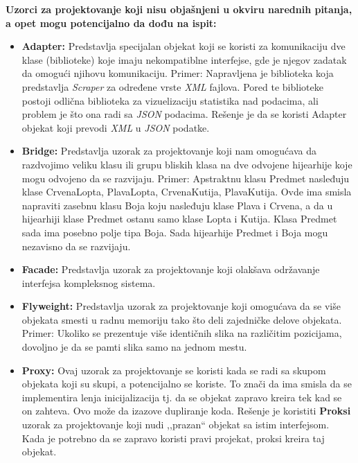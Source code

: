 \documentclass[a4paper]{article}
\begin{document}
  \textbf{Uzorci za projektovanje koji nisu objašnjeni u okviru narednih pitanja, a opet mogu potencijalno da
          dođu na ispit:}
  \begin{itemize}
    \item \textbf{Adapter:} Predstavlja specijalan objekat koji se koristi za komunikaciju dve klase (biblioteke) koje 
          imaju nekompatiblne interfejse, gde je njegov zadatak da omogući njihovu komunikaciju. Primer: Napravljena
          je biblioteka koja predstavlja \textit{Scraper} za određene vrste \textit{XML} fajlova. Pored te biblioteke 
          postoji odlična biblioteka za vizuelizaciju statistika nad podacima, ali problem je što ona radi sa 
          \textit{JSON} podacima. Rešenje je da se koristi Adapter objekat koji prevodi \textit{XML} u \textit{JSON}
          podatke.
    \item \textbf{Bridge:} Predstavlja uzorak za projektovanje koji nam omogućava da razdvojimo veliku klasu
          ili grupu bliskih klasa na dve odvojene hijearhije koje mogu odvojeno da se razvijaju. Primer:
          Apstraktnu klasu Predmet nasleđuju klase CrvenaLopta, PlavaLopta, CrvenaKutija, PlavaKutija. Ovde ima 
          smisla napraviti zasebnu klasu Boja koju nasleđuju klase Plava i Crvena, a da u hijearhiji klase Predmet
          ostanu samo klase Lopta i Kutija. Klasa Predmet sada ima posebno polje tipa Boja. Sada hijearhije 
          Predmet i Boja mogu nezavisno da se razvijaju.
    \item \textbf{Facade:} Predstavlja uzorak za projektovanje koji olakšava održavanje interfejsa kompleksnog sistema.
    \item \textbf{Flyweight:} Predstavlja uzorak za projektovanje koji omogućava da se više objekata smesti u radnu 
          memoriju tako što deli zajedničke delove objekata. Primer: Ukoliko se prezentuje više identičnih slika
          na različitim pozicijama, dovoljno je da se pamti slika samo na jednom mestu.
    \item \textbf{Proxy:} Ovaj uzorak za projektovanje se koristi kada se radi sa skupom objekata koji su skupi,
          a potencijalno se koriste. To znači da ima smisla da se implementira lenja inicijalizacija tj. 
          da se objekat zapravo kreira tek kad se on zahteva. Ovo može da izazove dupliranje koda. Rešenje je 
          koristiti \textbf{Proksi} uzorak za projektovanje koji nudi ,,prazan`` objekat sa istim interfejsom.
          Kada je potrebno da se zapravo koristi pravi projekat, proksi kreira taj objekat.
  \end{itemize}
\end{document}
